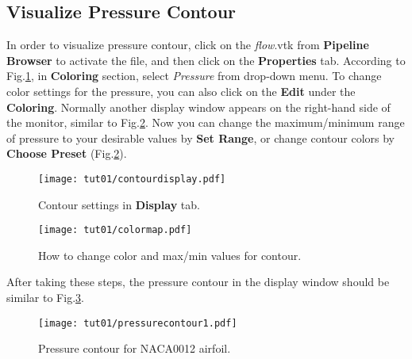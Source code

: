 \subsection{Visualize Pressure Contour}
In order to visualize pressure contour, click on the \textit{flow}.vtk from \textbf{Pipeline Browser} to activate the file, and then click on the \textbf{Properties} tab. According to Fig.\ref{fig:colorby}, in \textbf{Coloring} section, select \textit{Pressure} from drop-down menu. To change color settings for the pressure, you can also click on the \textbf{Edit} under the \textbf{Coloring}. Normally another display window appears on the right-hand side of the monitor, similar to Fig.\ref{fig:change_color_range}. Now you can change the maximum/minimum range of pressure to your desirable values by \textbf{Set Range}, or change contour colors by \textbf{Choose Preset} (Fig.\ref{fig:change_color_range}).
\begin{figure}[htbp]
    \centering
    \texttt{[image: tut01/contourdisplay.pdf]}
    \caption{Contour settings in \textbf{Display} tab.}
    \label{fig:colorby}
\end{figure}
\begin{figure}[htbp]
    \centering
    \texttt{[image: tut01/colormap.pdf]}
    \caption{How to change color and max/min values for contour.}
    \label{fig:change_color_range}
\end{figure}
After taking these steps, the pressure contour in the display window should be similar to Fig.\ref{fig:pressure_contour}.
\begin{figure}[htbp]
    \centering
    \texttt{[image: tut01/pressurecontour1.pdf]}
    \caption{Pressure contour for NACA0012 airfoil.}
    \label{fig:pressure_contour}
\end{figure}

